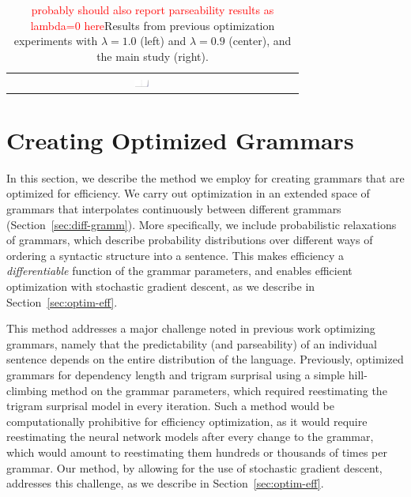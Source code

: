 \documentclass[10pt,twoside,lineno]{article}
\begin{document}
\begin{table}[hbt!]
\begin{center}
{\begin{tabular}{|c|ccc|c}
		&   \multirow{2}{*}{  \includegraphics[width=0.06\textwidth]{../results/correlations/figures/posteriors/posterior_Efficiency_xcomp.pdf}     }  \\
&&&\\ \hline
 \hline
\end{tabular}
}
	\end{center}
\caption{\textcolor{red}{probably should also report parseability results as lambda=0 here}Results from previous optimization experiments with $\lambda=1.0$ (left) and $\lambda=0.9$ (center), and the main study (right).}\label{table:corr-resu}
\end{table}


% 



\section{Creating Optimized Grammars}

In this section, we describe the method we employ for creating grammars that are optimized for efficiency.
We carry out optimization in an extended space of grammars that interpolates continuously between different grammars (Section~\ref{sec:diff-gramm}).
More specifically, we include probabilistic relaxations of grammars, which describe probability distributions over different ways of ordering a syntactic structure into a sentence.
This makes efficiency a \emph{differentiable} function of the grammar parameters, and enables efficient optimization with stochastic gradient descent, as we describe in Section~\ref{sec:optim-eff}.

This method addresses a major challenge noted in previous work optimizing grammars, namely that the predictability (and parseability) of an individual sentence depends on the entire distribution of the language.
Previously, \citet{gildea2015human} optimized grammars for dependency length and trigram surprisal using a simple hill-climbing method on the grammar parameters, which required reestimating the trigram surprisal model in every iteration.
Such a method would be computationally prohibitive for efficiency optimization, as it would require reestimating the neural network models after every change to the grammar, which would amount to reestimating them hundreds or thousands of times per grammar.
Our method, by allowing for the use of stochastic gradient descent, addresses this challenge, as we describe in Section~\ref{sec:optim-eff}.
\end{document}
